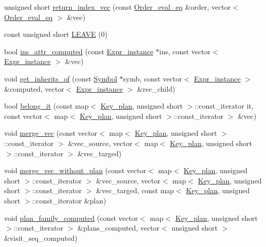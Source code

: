 \begin{CompactItemize}
\item 
unsigned short \hyperlink{namespacegenevalmag_4c59332bf08ed52e98321fe6b6340f29}{return\_\-index\_\-vec} (const \hyperlink{namespacegenevalmag_0bb2e8b0fa1b07b873f0363719de7b64}{Order\_\-eval\_\-eq} \&order, vector$<$ \hyperlink{namespacegenevalmag_0bb2e8b0fa1b07b873f0363719de7b64}{Order\_\-eval\_\-eq} $>$ \&vec)
\item 
const unsigned short \hyperlink{namespacegenevalmag_48db0c2de005498a27cd549338a38cdd}{LEAVE} (0)
\item 
bool \hyperlink{namespacegenevalmag_bf07d8c3d3faf1a57304337d32ff0f29}{ins\_\-attr\_\-computed} (const \hyperlink{classgenevalmag_1_1Expr__instance}{Expr\_\-instance} $\ast$ins, const vector$<$ \hyperlink{classgenevalmag_1_1Expr__instance}{Expr\_\-instance} $>$ \&vec)
\item 
void \hyperlink{namespacegenevalmag_e77f9a26f51553fb1419a41295da521a}{get\_\-inherits\_\-of} (const \hyperlink{classgenevalmag_1_1Symbol}{Symbol} $\ast$symb, const vector$<$ \hyperlink{classgenevalmag_1_1Expr__instance}{Expr\_\-instance} $>$ \&computed, vector$<$ \hyperlink{classgenevalmag_1_1Expr__instance}{Expr\_\-instance} $>$ \&rec\_\-child)
\item 
bool \hyperlink{namespacegenevalmag_d52b23b8c38d8b9ef4c91820a512c963}{belong\_\-it} (const map$<$ \hyperlink{structgenevalmag_1_1k__plan}{Key\_\-plan}, unsigned short $>$::const\_\-iterator it, const vector$<$ map$<$ \hyperlink{structgenevalmag_1_1k__plan}{Key\_\-plan}, unsigned short $>$::const\_\-iterator $>$ \&vec)
\item 
void \hyperlink{namespacegenevalmag_3d48cfd13c4608c5235a6968c63855da}{merge\_\-vec} (const vector$<$ map$<$ \hyperlink{structgenevalmag_1_1k__plan}{Key\_\-plan}, unsigned short $>$::const\_\-iterator $>$ \&vec\_\-source, vector$<$ map$<$ \hyperlink{structgenevalmag_1_1k__plan}{Key\_\-plan}, unsigned short $>$::const\_\-iterator $>$ \&vec\_\-targed)
\item 
void \hyperlink{namespacegenevalmag_036ececec487ad3d0674f8e5e0c62f6a}{merge\_\-vec\_\-without\_\-plan} (const vector$<$ map$<$ \hyperlink{structgenevalmag_1_1k__plan}{Key\_\-plan}, unsigned short $>$::const\_\-iterator $>$ \&vec\_\-source, vector$<$ map$<$ \hyperlink{structgenevalmag_1_1k__plan}{Key\_\-plan}, unsigned short $>$::const\_\-iterator $>$ \&vec\_\-targed, const map$<$ \hyperlink{structgenevalmag_1_1k__plan}{Key\_\-plan}, unsigned short $>$::const\_\-iterator \&plan)
\item 
void \hyperlink{namespacegenevalmag_22c7e9c74db3b8c0f0b7a3a1cbf5a978}{plan\_\-family\_\-computed} (const vector$<$ map$<$ \hyperlink{structgenevalmag_1_1k__plan}{Key\_\-plan}, unsigned short $>$::const\_\-iterator $>$ \&plans\_\-computed, vector$<$ unsigned short $>$ \&visit\_\-seq\_\-computed)

\end{CompactItemize}
